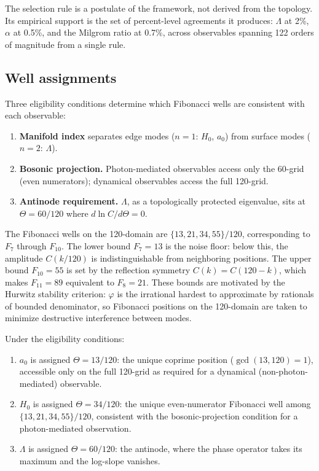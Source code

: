 \documentclass[
    aps,
    prd,
    reprint,
    superscriptaddress,
    nofootinbib,
    floatfix
]{revtex4-2}
\begin{document}
The selection rule is a postulate of the framework, not derived
from the topology. Its empirical support is the set of percent-level
agreements it produces: $\Lambda$ at 2\%, $\alpha$ at 0.5\%, and the
Milgrom ratio at 0.7\%, across observables spanning 122 orders of
magnitude from a single rule.

\subsection{Well assignments}
\label{app:framework-wells}

Three eligibility conditions determine which Fibonacci wells are
consistent with each observable:

\begin{enumerate}
\item \textbf{Manifold index} separates edge modes ($n = 1$: $H_0$,
$a_0$) from surface modes ($n = 2$: $\Lambda$).

\item \textbf{Bosonic projection.} Photon-mediated observables
access only the 60-grid (even numerators); dynamical observables
access the full 120-grid.

\item \textbf{Antinode requirement.} $\Lambda$, as a topologically
protected eigenvalue, sits at $\Theta = 60/120$ where
$d\ln C/d\Theta = 0$.
\end{enumerate}

The Fibonacci wells on the 120-domain are
$\{13, 21, 34, 55\}/120$, corresponding to $F_7$ through $F_{10}$.
The lower bound $F_7 = 13$ is the noise floor: below this, the
amplitude $C(k/120)$ is indistinguishable from neighboring positions.
The upper bound $F_{10} = 55$ is set by the reflection symmetry
$C(k) = C(120 - k)$, which makes $F_{11} = 89$ equivalent to
$F_8 = 21$. These bounds are motivated by the Hurwitz stability
criterion: $\varphi$ is the irrational hardest to approximate by
rationals of bounded denominator, so Fibonacci positions on the
120-domain are taken to minimize destructive interference between
modes.

Under the eligibility conditions:

\begin{enumerate}[label=(\alph*)]
\item $a_0$ is assigned $\Theta = 13/120$: the unique coprime
position ($\gcd(13, 120) = 1$), accessible only on the full 120-grid
as required for a dynamical (non-photon-mediated) observable.

\item $H_0$ is assigned $\Theta = 34/120$: the unique even-numerator
Fibonacci well among $\{13, 21, 34, 55\}/120$, consistent with the
bosonic-projection condition for a photon-mediated observation.

\item $\Lambda$ is assigned $\Theta = 60/120$: the antinode, where
the phase operator takes its maximum and the log-slope vanishes.
\end{enumerate}
\end{document}
